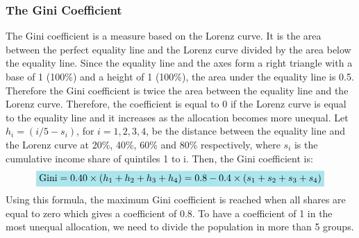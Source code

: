 \documentclass[letterpaper]{article}\usepackage[]{graphicx}\usepackage[]{color}
\numberwithin{exer}{section}
\theoremstyle{nonumberplain}
\newcommand{\mathcolorbox}[1]{\colorbox{blizzardblue}{$\displaystyle #1$}}
\begin{document}
\subsubsection*{The Gini Coefficient}

The Gini coefficient is a measure based on the Lorenz curve. It is the
area between the perfect equality line and the Lorenz curve divided by
the area below the equality line. Since the equality line and the axes
form a right triangle with a base of 1 (100\%) and a height of 1
(100\%), the area under the equality line is 0.5. Therefore the Gini
coefficient is twice the area between the equality line and the Lorenz
curve. Therefore, the coefficient is equal to 0 if the Lorenz curve is
equal to the equality line and it increases as the allocation becomes
more unequal. Let $h_i=(i/5-s_i)$, for $i=1,2,3,4$, be the distance
between the equality line and the Lorenz curve at 20\%, 40\%, 60\% and
80\% respectively, where $s_i$ is the cumulative income share of
quintiles 1 to i. Then, the Gini coefficient is:
\[
\mathcolorbox{
\mathrm{Gini} = 0.40 \times (h_1+h_2+h_3+h_4) = 0.8-0.4\times(s_1+s_2+s_3+s_4)}
\]
Using this formula, the maximum Gini coefficient is reached when all
shares are equal to zero which gives a coefficient of 0.8. To have a
coefficient of 1 in the most unequal allocation, we need to divide the
population in more than 5 groups.
\end{document}
